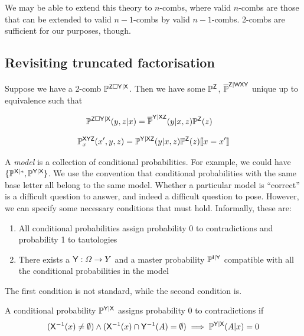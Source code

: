 We may be able to extend this theory to $n$-combs, where valid $n$-combs are those that can be extended to valid $n-1$-combs by valid $n-1$-combs. 2-combs are sufficient for our purposes, though.

\subsection{Revisiting truncated factorisation}

Suppose we have a 2-comb $\mathbb{P}^{\mathsf{Z}\square\mathsf{Y}|\mathsf{X}}$. Then we have some $\mathbb{P}^{\mathsf{Z}}$, $\overline{\mathbb{P}}^{\mathsf{Z}|\mathsf{WXY}}$ unique up to equivalence such that

\begin{align}
	\mathbb{P}^{\mathsf{Z}\square\mathsf{Y}|\mathsf{X}}(y,z|x) &= \overline{\mathbb{P}}^{\mathsf{Y|XZ}}(y|x,z)\mathbb{P}^{\mathsf{Z}}(z)
\end{align}

\begin{align}
	\mathbb{P}^{\mathsf{XYZ}}_{x}(x',y,z)=\mathbb{P}^{\mathsf{Y|XZ}}(y|x,z)\mathbb{P}^{\mathsf{Z}}(z)\llbracket x=x' \rrbracket\label{eq:truncated_fac}
\end{align}

A \emph{model} is a collection of conditional probabilities. For example, we could have $\{\mathbb{P}^{\mathsf{X}|*},\mathbb{P}^{\mathsf{Y}|\mathsf{X}}\}$. We use the convention that conditional probabilities with the same base letter all belong to the same model. Whether a particular model is ``correct'' is a difficult question to answer, and indeed a difficult question to pose. However, we can specify some necessary conditions that must hold. Informally, these are:

\begin{enumerate}
	\item All conditional probabilities assign probability 0 to contradictions and probability 1 to tautologies
	\item There exists a $\mathsf{Y}:\Omega\to Y$ and a master probability $\mathbb{P}^{\mathsf{I}|\mathsf{Y}}$ compatible with all the conditional probabilities in the model
\end{enumerate}

The first condition is not standard, while the second condition is.

\begin{definition}\label{def:prob_0_contradiction}
A conditional probability $\mathbb{P}^{\mathsf{Y}|\mathsf{X}}$ assigns probability 0 to contradictions if 
\begin{align}
	(\mathsf{X}^{-1}(x)\neq \emptyset)\land (\mathsf{X}^{-1}(x)\cap \mathsf{Y}^{-1}(A) = \emptyset) \implies\mathbb{P}^{\mathsf{Y}|\mathsf{X}}(A|x) = 0
\end{align}
\end{definition}

